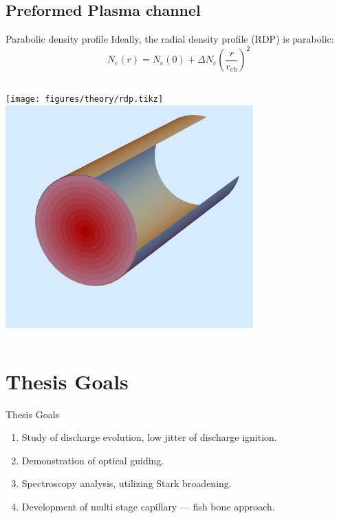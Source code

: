 \documentclass[]{beamer}
\begin{document}
\subsection{Preformed Plasma channel}
\begin{frame}{Parabolic density profile}
  Ideally, the radial density profile (RDP) is parabolic:
    \begin{equation*}
    N_e(r)=N_e(0)+\Delta N_e\left( \frac{r}{r_\text{ch}}\right)^2
  \end{equation*}
  \begin{columns}
    \texttt{[image: figures/theory/rdp.tikz]}
    \includegraphics[width=\textwidth]{figures/theory/why channel forms.png}
  \end{columns}
\end{frame}
\section{Thesis Goals}
\begin{frame}{Thesis Goals}
  \begin{enumerate}
    \item Study of discharge evolution, low jitter of discharge ignition.
    \item Demonstration of optical guiding.
    \item Spectroscopy analysis, utilizing Stark broadening.
    \item Development of multi stage capillary --- fish bone approach.
  \end{enumerate}
\end{frame}
\end{document}
